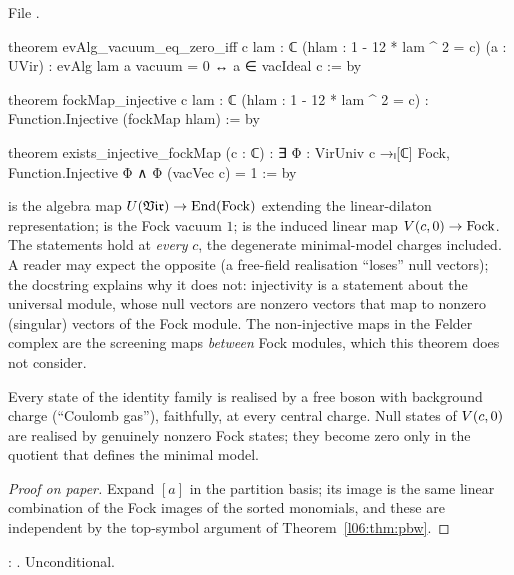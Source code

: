 File .
\begin{leancode}
theorem evAlg_vacuum_eq_zero_iff {c lam : ℂ} (hlam : 1 - 12 * lam ^ 2 = c) (a : UVir) :
    evAlg lam a vacuum = 0 ↔ a ∈ vacIdeal c := by

theorem fockMap_injective {c lam : ℂ} (hlam : 1 - 12 * lam ^ 2 = c) :
    Function.Injective (fockMap hlam) := by

theorem exists_injective_fockMap (c : ℂ) :
    ∃ Φ : VirUniv c →ₗ[ℂ] Fock, Function.Injective Φ ∧ Φ (vacVec c) = 1 := by
\end{leancode}

\begin{dictionary}
 is the algebra map $U(\mathfrak{Vir})\to\operatorname{End}(\mathrm{Fock})$ extending the linear-dilaton
representation;  is the Fock vacuum $1$;  is the induced linear map
$V(c,0)\to\mathrm{Fock}$. The statements hold at \emph{every} $c$, the degenerate minimal-model charges
included. A reader may expect the opposite (a free-field realisation ``loses'' null vectors); the
docstring explains why it does not: injectivity is a statement about the universal module, whose null
vectors are nonzero vectors that map to nonzero (singular) vectors of the Fock module. The non-injective
maps in the Felder complex are the screening maps \emph{between} Fock modules, which this theorem does
not consider.
\end{dictionary}

\begin{physics}
Every state of the identity family is realised by a free boson with background charge (``Coulomb gas''),
faithfully, at every central charge. Null states of $V(c,0)$ are realised by genuinely nonzero Fock
states; they become zero only in the quotient that defines the minimal model.
\end{physics}

\begin{proof}[Proof on paper]
Expand $[a]$ in the partition basis; its image is the same linear combination of the Fock images of the
sorted monomials, and these are independent by the top-symbol argument of Theorem~\ref{l06:thm:pbw}.
\end{proof}

\begin{status}
\allowbreak{}\allowbreak{}\allowbreak{}: \lean{[propext, Classical.}\allowbreak{}\allowbreak\lean{sound]}. Unconditional.
\end{status}


